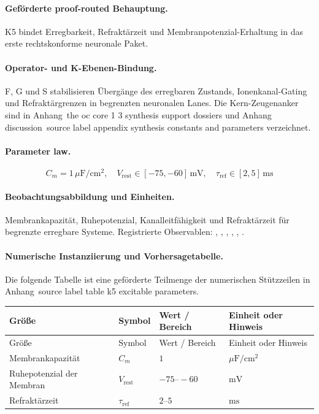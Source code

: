 \paragraph{Geförderte proof-routed Behauptung.}
K5 bindet Erregbarkeit, Refraktärzeit und Membranpotenzial-Erhaltung in das erste rechtskonforme neuronale Paket.

\paragraph{Operator- und K-Ebenen-Bindung.}
F, G und S stabilisieren Übergänge des erregbaren Zustands, Ionenkanal-Gating und Refraktärgrenzen in begrenzten neuronalen Lanes.
Die Kern-Zeugenanker sind in Anhang~the oc core 1 3 synthesis support dossiers und Anhang discussion~source label appendix synthesis constants and parameters verzeichnet.

\paragraph{Parameter law.}
\[
C_m = 1\,\mu\mathrm{F/cm^2},\quad V_{\mathrm{rest}} \in [-75,-60]\,\mathrm{mV},\quad \tau_{\mathrm{ref}} \in [2,5]\,\mathrm{ms}
\]

\paragraph{Beobachtungsabbildung und Einheiten.}
Membrankapazität, Ruhepotenzial, Kanalleitfähigkeit und Refraktärzeit für begrenzte erregbare Systeme.
Registrierte Observablen: , \allowbreak {}, \allowbreak {}, \allowbreak {}, \allowbreak {}, \allowbreak {}.

\paragraph{Numerische Instanziierung und Vorhersagetabelle.}
Die folgende Tabelle ist eine geförderte Teilmenge der numerischen Stützzeilen in Anhang~source label table k5 excitable parameters.
\begin{longtable}{@{}L{0.27\textwidth}L{0.15\textwidth}L{0.24\textwidth}L{0.16\textwidth}@{}}
\toprule
Größe & Symbol & Wert / Bereich & Einheit oder Hinweis \\
\midrule
\endfirsthead
\toprule
Größe & Symbol & Wert / Bereich & Einheit oder Hinweis \\
\midrule
\endhead
Membrankapazität & $\scriptstyle C_m$ & $1$ & $\mu\mathrm{F/cm^2}$ \\
Ruhepotenzial der Membran & $\scriptstyle V_{\mathrm{rest}}$ & $-75\text{--}-60$ & $\mathrm{mV}$ \\
Refraktärzeit & $\scriptstyle \tau_{\mathrm{ref}}$ & $2\text{--}5$ & $\mathrm{ms}$ \\
\bottomrule
\end{longtable}

